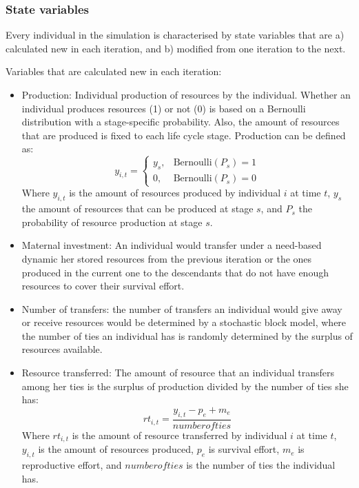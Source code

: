 \documentclass{article}
\begin{document}
\subsubsection{State variables}

Every individual in the simulation is characterised by state variables that are a) calculated new in each iteration, and b) modified from one iteration to the next.

Variables that are calculated new in each iteration:
    \begin{itemize}
        \item Production: Individual production of resources by the individual. Whether an individual produces resources (1) or not (0) is based on a Bernoulli distribution with a stage-specific probability. Also, the amount of resources that are produced is fixed to each life cycle stage. Production can be defined as:
\begin{equation}
    y_{i,t}=\begin{cases}
    y_s,& \text{Bernoulli}(P_s)=1\\
    0,& \text{Bernoulli}(P_s)=0
\end{cases}
\end{equation}
        Where $y_{i,t}$ is the amount of resources produced by individual $i$ at time $t$, $y_{s}$ the amount of resources that can be produced at stage $s$, and $P_{s}$ the probability of resource production at stage $s$.
        \item Maternal investment: An individual would transfer under a need-based dynamic her stored resources from the previous iteration or the ones produced in the current one to the descendants that do not have enough resources to cover their survival effort.
        \item Number of transfers: the number of transfers an individual would give away or receive resources would be determined by a stochastic block model, where the number of ties an individual has is randomly determined by the surplus of resources available.
        \item Resource transferred: The amount of resource that an individual transfers among her ties is the surplus of production divided by the number of ties she has:
\begin{equation}
    rt_{i,t}=\frac{y_{i,t}-p_e+m_e}{number of ties}        
\end{equation}
        Where $rt_{i,t}$ is the amount of resource transferred by individual $i$ at time $t$, $y_{i,t}$ is the amount of resources produced, $p_e$ is survival effort, $m_e$ is reproductive effort, and $number of ties$ is the number of ties the individual has.

\end{itemize}
\end{document}
